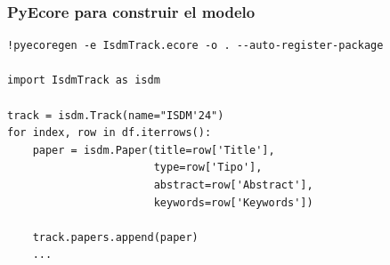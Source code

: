 \begin{frame}[fragile]
  \frametitle{PyEcore para construir el modelo}
\begin{lstlisting}[basicstyle=\large\tt]
%pip install pyecore pyecoregen
!pyecoregen -e IsdmTrack.ecore -o . --auto-register-package

import IsdmTrack as isdm

track = isdm.Track(name="ISDM'24")
for index, row in df.iterrows():
    paper = isdm.Paper(title=row['Title'],
                       type=row['Tipo'],
                       abstract=row['Abstract'],
                       keywords=row['Keywords'])

    track.papers.append(paper)
    ...
\end{lstlisting}
\end{frame}








